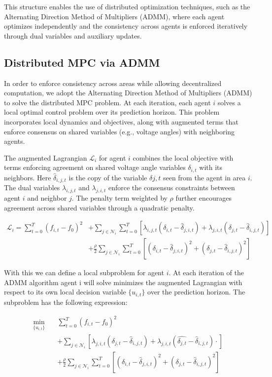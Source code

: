 \documentclass{article}
\begin{document}
This structure enables the use of distributed optimization techniques, such as the Alternating Direction Method of Multipliers (ADMM), where each agent optimizes independently and the consistency across agents is enforced iteratively through dual variables and auxiliary updates.

\subsection{Distributed MPC via ADMM}

In order to enforce consistency across areas while allowing decentralized computation, we adopt the Alternating Direction Method of Multipliers (ADMM) to solve the distributed MPC problem. At each iteration, each agent $i$ solves a local optimal control problem over its prediction horizon. This problem incorporates local dynamics and objectives, along with augmented terms that enforce consensus on shared variables (e.g., voltage angles) with neighboring agents.

The augmented Lagrangian $\mathcal{L}_i$ for agent $i$ combines the local objective with terms enforcing agreement on shared voltage angle variables $\delta_{i,t}$ with its neighbors. Here $\hat{\delta}_{i,j,t}$ is the copy of the variable $\delta{j,t}$ seen from the agent in area $i$. The dual variables $\lambda_{i,j,t}$ and $\lambda_{j,i,t}$ enforce the consensus constraints between agent $i$ and neighbor $j$. The penalty term weighted by $\rho$ further encourages agreement across shared variables through a quadratic penalty.
 
\begin{align}
    \mathcal{L}_i = \sum_{t=0}^{T} (f_{i,t} - f_0)^2 &+ \sum_{j \in \mathcal{N}_i} \sum_{t=0}^T \left[ \lambda_{i,j,t} (\delta_{i,t} - \hat{\delta}_{j,i,t}) + \lambda_{j,i,t} (\delta_{j,t} - \hat{\delta}_{i,j,t}) \right] \nonumber \\
    &+ \frac{\rho}{2} \sum_{j \in \mathcal{N}_i} \sum_{t=0}^T \left[ (\delta_{i,t} - \hat{\delta}_{j,i,t})^2 + (\delta_{j,t} - \hat{\delta}_{i,j,t})^2 \right]
\end{align}

With this we can define a local subproblem for agent $i$. At each iteration of the ADMM algorithm agent i will solve minimizes the augmented Lagrangian with respect to its own local decision variable $\{u_{i,t}\}$ over the prediction horizon. The subproblem has the following expression:

\begin{align}
    \min_{\{u_{i,t}\}} \quad & \sum_{t=0}^{T} (f_{i,t} - f_0)^2 \nonumber \\
    &+ \sum_{j \in \mathcal{N}_i} \left[ \lambda_{j,i,t}(\delta_{j,t} - \hat{\delta}_{i,j,t})  + \lambda_{j,i,t}(\hat{\delta_{j,t}} - \hat{\delta}_{i, j, t}) \cdot  \right] \nonumber \\
    &+ \frac{\rho}{2} \sum_{j \in \mathcal{N}_i} \sum_{t=0}^T \left[ (\delta_{i,t} - \hat{\delta}_{j,i,t})^2 + (\delta_{j,t} - \hat{\delta}_{i,j,t})^2 \right]
\end{align}
\end{document}

